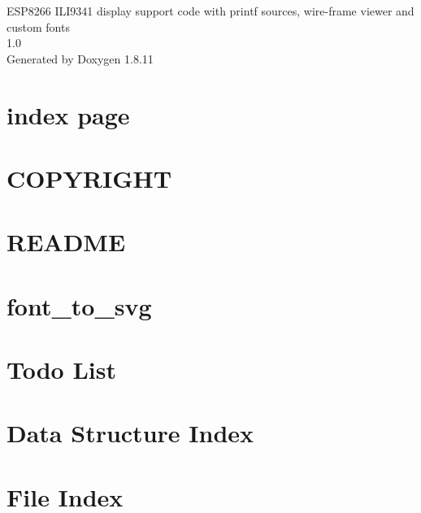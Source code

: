 \documentclass[twoside]{book}
\newcommand{\+}{\discretionary{\mbox{\scriptsize$\hookleftarrow$}}{}{}}
\newcommand{\clearemptydoublepage}{%
  \newpage{\pagestyle{empty}\cleardoublepage}%
}
\begin{document}
\hypersetup{pageanchor=false,
             bookmarksnumbered=true,
             pdfencoding=unicode
            }
\begin{titlepage}
\vspace*{7cm}
\begin{center}%
{\Large E\+S\+P8266 I\+L\+I9341 display support code with printf sources, wire-\/frame viewer and custom fonts \\[1ex]\large 1.\+0 }\\
\vspace*{1cm}
{\large Generated by Doxygen 1.8.11}\\
\end{center}
\end{titlepage}
\clearemptydoublepage
\tableofcontents
\clearemptydoublepage
{}
\hypersetup{pageanchor=true}

\chapter{index page}
\label{index}\hypertarget{index}{}
\chapter{C\+O\+P\+Y\+R\+I\+G\+HT}
\label{md_COPYRIGHT}
\hypertarget{md_COPYRIGHT}{}

\chapter{R\+E\+A\+D\+ME}
\label{md_README}
\hypertarget{md_README}{}

\chapter{font\+\_\+to\+\_\+svg}
\label{md_vfonts_README}
\hypertarget{md_vfonts_README}{}

\chapter{Todo List}
\label{todo}
\hypertarget{todo}{}

\chapter{Data Structure Index}

\chapter{File Index}

\end{document}
